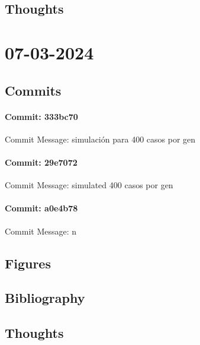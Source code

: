 \documentclass{article}
\begin{document}
\subsection{Thoughts}

\section{07-03-2024}
\subsection{Commits}
\paragraph{Commit: 333bc70}
Commit Message: simulación para 400 casos por gen

\paragraph{Commit: 29e7072}
Commit Message: simulated 400 casos por gen

\paragraph{Commit: a0e4b78}
Commit Message: n

\subsection{Figures}
\subsection{Bibliography}
\subsection{Thoughts}
\end{document}
